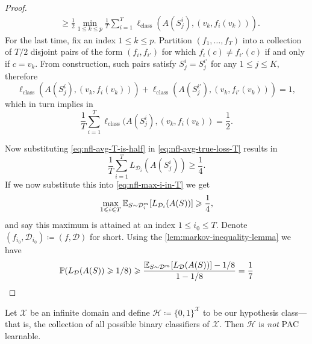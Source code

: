 \begin{proof}
\begin{align}
         & \geq \frac{1}{2} \min_{1 \leq k \leq p} \frac{1}{T}
        \sum_{i=1}^T \ell_{\text{class}}(A(S_j^i), (v_k, f_i(v_k))).
    \end{align}
    For the last time, fix an index \(1 \leq k \leq p\). Partition \((f_1, \dots,
    f_T)\) into a collection of \(T/2\) disjoint pairs of the form \((f_i, f_{i'})\)
    for which \(f_i(c) \neq f_{i'}(c)\) if and only if \(c = v_k\). From
    construction, such pairs satisfy \(S_j^i = S_j^{i'}\) for any \(1 \leq j \leq
    K\), therefore
    \[
        \ell_{\text{class}}(A(S_j^i), (v_k, f_i(v_k)))
        + \ell_{\text{class}}(A(S_j^{i'}), (v_k, f_{i'}(v_k)))
        = 1,
    \]
    which in turn implies in
    \begin{equation}\label{eq:nfl-avg-T-is-half}
        \frac{1}{T} \sum_{i=1}^T \ell_{\text{class}}(A(S_j^i), (v_k, f_i(v_k)) = \frac{1}{2}.
    \end{equation}

    Now substituting \cref{eq:nfl-avg-T-is-half} in \cref{eq:nfl-avg-true-loss-T}
    results in
    \[
        \frac{1}{T} \sum_{i=1}^{T} L_{\mathcal{D}_i}(A(S_j^i)) \geq \frac{1}{4}.
    \]
    If we now substitute this into \cref{eq:nfl-max-i-in-T} we get
    \[
        \max_{1 \leqslant i \leqslant T} \operatorname{\mathbb{E}}_{S \sim \mathcal{D}_i^m}[L_{\mathcal{D}_i}(A(S))]
        \geqslant \frac{1}{4},
    \]
    and say this maximum is attained at an index \(1 \leq i_0 \leq T\). Denote
    \((f_{i_0}, \mathcal{D}_{i_0}) \coloneq (f, \mathcal{D})\) for short. Using the
    \cref{lem:markov-inequality-lemma} we have
    \[
        \operatorname{\mathbb{P}}(L_{\mathcal{D}}(A(S)) \geqslant 1/8)
        \geqslant \frac{\operatorname{\mathbb{E}}_{S \sim \mathcal{D}^m}[L_{\mathcal{D}}(A(S))] - 1/8}{1 - 1/8}
        = \frac{1}{7}
    \]
\end{proof}

\begin{corollary}
    \label{cor:full-hypothesis-class-not-pac-learnable}
    Let \(\mathcal{X}\) be an infinite domain and define
    \(\mathcal{H} \coloneq \{0, 1\}^{\mathcal{X}}\) to be our hypothesis class---that is, the collection of all
    possible binary classifiers of \(\mathcal{X}\). Then
    \(\mathcal{H}\) is \emph{not} PAC learnable.
\end{corollary}

